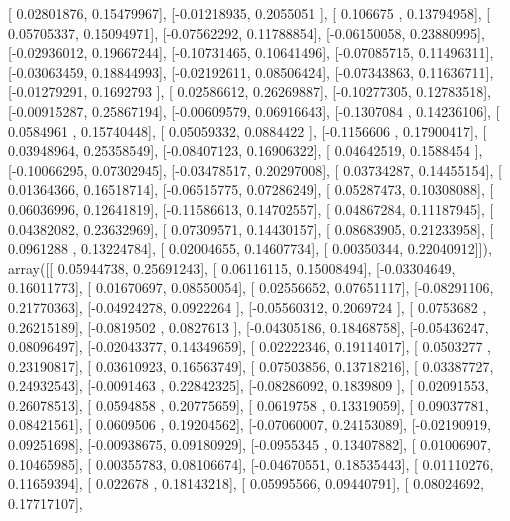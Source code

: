 \documentclass{article}
\begin{document}
       [ 0.02801876,  0.15479967],
       [-0.01218935,  0.2055051 ],
       [ 0.106675  ,  0.13794958],
       [ 0.05705337,  0.15094971],
       [-0.07562292,  0.11788854],
       [-0.06150058,  0.23880995],
       [-0.02936012,  0.19667244],
       [-0.10731465,  0.10641496],
       [-0.07085715,  0.11496311],
       [-0.03063459,  0.18844993],
       [-0.02192611,  0.08506424],
       [-0.07343863,  0.11636711],
       [-0.01279291,  0.1692793 ],
       [ 0.02586612,  0.26269887],
       [-0.10277305,  0.12783518],
       [-0.00915287,  0.25867194],
       [-0.00609579,  0.06916643],
       [-0.1307084 ,  0.14236106],
       [ 0.0584961 ,  0.15740448],
       [ 0.05059332,  0.0884422 ],
       [-0.1156606 ,  0.17900417],
       [ 0.03948964,  0.25358549],
       [-0.08407123,  0.16906322],
       [ 0.04642519,  0.1588454 ],
       [-0.10066295,  0.07302945],
       [-0.03478517,  0.20297008],
       [ 0.03734287,  0.14455154],
       [ 0.01364366,  0.16518714],
       [-0.06515775,  0.07286249],
       [ 0.05287473,  0.10308088],
       [ 0.06036996,  0.12641819],
       [-0.11586613,  0.14702557],
       [ 0.04867284,  0.11187945],
       [ 0.04382082,  0.23632969],
       [ 0.07309571,  0.14430157],
       [ 0.08683905,  0.21233958],
       [ 0.0961288 ,  0.13224784],
       [ 0.02004655,  0.14607734],
       [ 0.00350344,  0.22040912]]), array([[ 0.05944738,  0.25691243],
       [ 0.06116115,  0.15008494],
       [-0.03304649,  0.16011773],
       [ 0.01670697,  0.08550054],
       [ 0.02556652,  0.07651117],
       [-0.08291106,  0.21770363],
       [-0.04924278,  0.0922264 ],
       [-0.05560312,  0.2069724 ],
       [ 0.0753682 ,  0.26215189],
       [-0.0819502 ,  0.0827613 ],
       [-0.04305186,  0.18468758],
       [-0.05436247,  0.08096497],
       [-0.02043377,  0.14349659],
       [ 0.02222346,  0.19114017],
       [ 0.0503277 ,  0.23190817],
       [ 0.03610923,  0.16563749],
       [ 0.07503856,  0.13718216],
       [ 0.03387727,  0.24932543],
       [-0.0091463 ,  0.22842325],
       [-0.08286092,  0.1839809 ],
       [ 0.02091553,  0.26078513],
       [ 0.0594858 ,  0.20775659],
       [ 0.0619758 ,  0.13319059],
       [ 0.09037781,  0.08421561],
       [ 0.0609506 ,  0.19204562],
       [-0.07060007,  0.24153089],
       [-0.02190919,  0.09251698],
       [-0.00938675,  0.09180929],
       [-0.0955345 ,  0.13407882],
       [ 0.01006907,  0.10465985],
       [ 0.00355783,  0.08106674],
       [-0.04670551,  0.18535443],
       [ 0.01110276,  0.11659394],
       [ 0.022678  ,  0.18143218],
       [ 0.05995566,  0.09440791],
       [ 0.08024692,  0.17717107],
\end{document}
